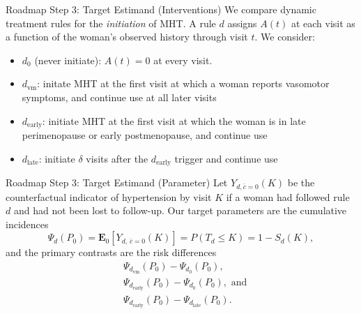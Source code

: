 \documentclass[11pt, xcolor={dvipsnames}, usepdftitle=false]{beamer}
\begin{document}
\begin{frame}{Roadmap Step 3: Target Estimand (Interventions)}
We compare dynamic treatment rules for the \emph{initiation} of MHT. A rule $d$ assigns $A(t)$ at each visit as a function of the woman's observed history through visit $t$. We consider:
\begin{itemize}
    \item $d_0$ (never initiate): $A(t) = 0$ at every visit.
    \item $d_{\text{vm}}$: initate MHT at the first visit at which a woman reports vasomotor symptoms, and continue use at all later visits
    \item $d_{\text{early}}$: initiate MHT at the first visit at which the woman is in late perimenopause or early postmenopause, and continue use %
    \item $d_{\text{late}}$: initiate $\delta$ visits after the $d_{\text{early}}$ trigger and continue use %
\end{itemize}
\end{frame}

\begin{frame}{Roadmap Step 3: Target Estimand (Parameter)}
Let $Y_{d,\bar{c}=0}(K)$ be the counterfactual indicator of hypertension by visit $K$ if a woman had followed rule $d$ and had not been lost to follow-up. Our target parameters are the cumulative incidences
\[
\Psi_d(P_0) = \mathbf{E}_0\left[Y_{d,\,\bar{c}=0}(K)\right] = P(T_d \le K) = 1 - S_d(K),
\]
and the primary contrasts are the risk differences
\begin{align*}
&\Psi_{d_{\text{vm}}}(P_0) - \Psi_{d_0}(P_0), \\ 
&\Psi_{d_{\text{early}}}(P_0) - \Psi_{d_0}(P_0), \text{ and} \\
&\Psi_{d_{\text{early}}}(P_0) - \Psi_{d_{\text{late}}}(P_0).
\end{align*}
\end{frame}

\end{document}
